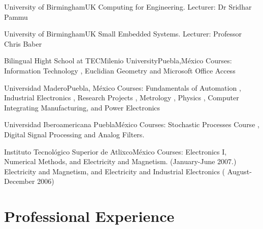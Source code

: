 \documentclass[10pt,a4paper,roman]{moderncv}
\begin{document}
{University of Birmingham}{UK}{}
{Computing for Engineering. Lecturer: Dr Sridhar Pammu}

{University of Birmingham}{UK}{}
{Small Embedded Systems. Lecturer: Professor Chris Baber}

{Bilingual Hight School at TECMilenio University}{Puebla,M\'exico}{}
{Courses:
Information Technology \href{https://sites.google.com/site/perezxochicale/teaching/iit}{\faExternalLink},
Euclidian Geometry  \href{https://sites.google.com/site/perezxochicale/teaching/euclidean-geometry}{\faExternalLink}
and
Microsoft Office Access \href{https://sites.google.com/site/perezxochicale/teaching/moa}{\faExternalLink}
}

{Universidad Madero}{Puebla, M\'exico}{}
{Courses: Fundamentals of Automation
\href{https://sites.google.com/site/perezxochicale/digital-electronics}{\faExternalLink},
Industrial Electronics \href{https://sites.google.com/site/perezxochicale/ie}{\faExternalLink},
Research Projects \href{https://sites.google.com/site/perezxochicale/latex/thesistemplate}{\faExternalLink},
Metrology \href{https://sites.google.com/site/perezxochicale/metrology}{\faExternalLink},
Physics \href{http://goo.gl/fffnG}{\faExternalLink},
Computer Integrating Manufacturing, and Power Electronics
}

{Universidad Iberoamericana Puebla}{M\'exico}{}
{Courses: Stochastic Processes Course
\href{https://sites.google.com/site/perezxochicale/stochastic-processes-course}{\faExternalLink},
Digital Signal Processing
\href{https://sites.google.com/site/perezxochicale/digital-signal-processing-course}{\faExternalLink}
and Analog Filters.
}

{Instituto Tecnol\'ogico Superior de Atlixco}{M\'exico}{}
{Courses: Electronics I, Numerical Methods, and Electricity and Magnetism. (January-June 2007.)
Electricity and Magnetism, and Electricity and Industrial Electronics ( August-December 2006)
}


\section{Professional Experience}
\end{document}
